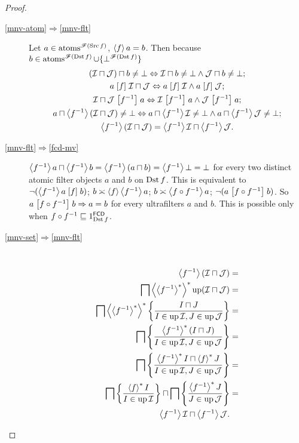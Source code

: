 \begin{proof}
~
\begin{description}
\item [{\ref{mnv-atom}$\Rightarrow$\ref{mnv-flt}}] Let
$a\in\operatorname{atoms}^{\mathscr{F}(\operatorname{Src} f)}$,
$\left\langle f\right\rangle a=b$. Then because $b\in\operatorname{atoms}^{\mathscr{F}(\operatorname{Dst}
f)}\cup\{\bot^{\mathscr{F}(\operatorname{Dst} f)}\}$
\begin{gather*}
(\mathcal{I}\sqcap\mathcal{J})\sqcap b\ne\bot \Leftrightarrow
\mathcal{I}\sqcap b\ne\bot\land\mathcal{J}\sqcap b\ne\bot;\\
a\mathrel{\left[f\right]}\mathcal{I}\sqcap\mathcal{J}\Leftrightarrow a\mathrel{\left[f\right]}\mathcal{I}\land
a\mathrel{\left[f\right]}\mathcal{J};\\
\mathcal{I}\sqcap\mathcal{J}\mathrel{\left[f^{-1}\right]}a\Leftrightarrow\mathcal{I}\mathrel{\left[f^
{-1}\right]}a\land\mathcal{J}\mathrel{\left[f^{-1}\right]}a;\\
a\sqcap\left\langle f^{-1}\right\rangle(\mathcal{I}\sqcap\mathcal{J})\ne\bot
\Leftrightarrow a\sqcap\left\langle f^{-1}\right\rangle\mathcal{I}\ne\bot
\land a\sqcap\left\langle f^{-1}\right\rangle\mathcal{J}\ne\bot;\\
\left\langle f^{-1}\right\rangle(\mathcal{I}\sqcap\mathcal{J})=\left\langle f^{-1}\right\rangle\mathcal{I}
\sqcap\left\langle f^{-1}\right\rangle\mathcal{J}.
\end{gather*}

\item [{\ref{mnv-flt}$\Rightarrow$\ref{fcd-mv}}]
$\left\langle f^{-1}\right\rangle a\sqcap\left\langle f^{-1}\right\rangle b=\left\langle f^{-1}\right\rangle(a\sqcap
b)=\left\langle f^{-1}\right\rangle\bot=\bot$
for every two distinct atomic filter objects $a$ and $b$ on $\operatorname{Dst} f$.
This is equivalent to $\lnot(\left\langle f^{-1}\right\rangle a\mathrel{\left[f\right]}b)$; $b\asymp\left\langle f\right\rangle\left\langle f^{-1}\right\rangle a$;
$b\asymp\left\langle f\circ f^{-1}\right\rangle a$; $\lnot(a\mathrel{\left[f\circ f^{-1}\right]}b)$.
So $a\mathrel{\left[f\circ f^{-1}\right]}b\Rightarrow a=b$ for every ultrafilters
$a$ and $b$. This is possible only when $f\circ f^{-1}\sqsubseteq1_{\operatorname{Dst}
f}^{\mathsf{FCD}}$.
\item [{\ref{mnv-set}$\Rightarrow$\ref{mnv-flt}}] ~
\begin{align*}
\left\langle f^{-1}\right\rangle(\mathcal{I}\sqcap\mathcal{J}) & =\\
\bigsqcap\left\langle \left\langle f^{-1}\right\rangle ^{\ast}\right\rangle ^{\ast}\operatorname{up}(\mathcal{I}\sqcap\mathcal{J}) & =\\
\bigsqcap\left\langle \left\langle f^{-1}\right\rangle ^{\ast}\right\rangle ^{\ast}\left\{ \frac{I\sqcap
J}{I\in\operatorname{up}\mathcal{I},J\in\operatorname{up}\mathcal{J}}\right\} & =\\
\bigsqcap\left\{ \frac{\left\langle f^{-1}\right\rangle ^{\ast}(I\sqcap J)}{I\in\operatorname{up}\mathcal{I},J\in\operatorname{up}\mathcal{J}}\right\}
& =\\
\bigsqcap\left\{ \frac{\left\langle f^{-1}\right\rangle ^{\ast}I\sqcap\left\langle f\right\rangle ^{\ast}J}{I\in\operatorname{up}\mathcal{I},J\in\operatorname{up}\mathcal{J}}\right\} & =\\
\bigsqcap\left\{ \frac{\left\langle f\right\rangle ^{\ast}I}{I\in\operatorname{up}\mathcal{I}}\right\}\sqcap\bigsqcap\left\{ \frac{\left\langle f^{-1}\right\rangle ^{\ast}J}{J\in\operatorname{up}\mathcal{J}}\right\}
& =\\
\left\langle f^{-1}\right\rangle\mathcal{I}\sqcap\left\langle f^{-1}\right\rangle\mathcal{J}.
\end{align*}


\end{description}
\end{proof}
